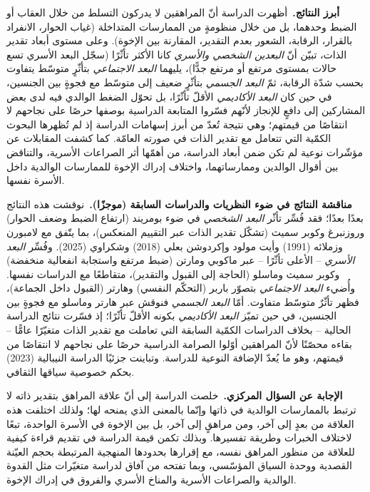 \documentclass[12pt,oneside]{report}
\begin{document}
\medskip
\noindent\textbf{أبرز النتائج.}\ أظهرت الدراسة أنّ المراهقين لا يدركون التسلط من خلال العقاب أو
الضبط وحدهما، بل من خلال منظومةٍ من الممارسات المتداخلة (غياب الحوار، الانفراد بالقرار، الرقابة،
الشعور بعدم التقدير، المقارنة بين الإخوة). وعلى مستوى أبعاد تقدير الذات، تبيّن أنّ \emph{البعدين
الشخصي والأسري} كانا الأكثر تأثّرًا (سجّل البعد الأسري تسع حالات بمستوى مرتفع أو مرتفع جدًّا)،
يليهما \emph{البعد الاجتماعي} بتأثّرٍ متوسّط يتفاوت بحسب شدّة الرقابة، ثمّ \emph{البعد الجسمي}
بتأثّرٍ ضعيف إلى متوسّط مع فجوةٍ بين الجنسين، في حين كان \emph{البعد الأكاديمي} الأقلّ تأثّرًا، بل
تحوّل الضغط الوالدي فيه لدى بعض المشاركين إلى دافعٍ للإنجاز لأنّهم فسّروا المتابعة الدراسية بوصفها
حرصًا على نجاحهم لا انتقاصًا من قيمتهم؛ وهي نتيجة تُعدّ من أبرز إسهامات الدراسة إذ لم تُظهرها
البحوث الكمّية التي تتعامل مع تقدير الذات في صورته العامّة. كما كشفت المقابلات عن مؤشّرات نوعية لم
تكن ضمن أبعاد الدراسة، من أهمّها أثر الصراعات الأسرية، والتناقض بين أقوال الوالدين وممارساتهما،
واختلاف إدراك الإخوة للممارسات الوالدية داخل الأسرة نفسها.

\medskip
\noindent\textbf{مناقشة النتائج في ضوء النظريات والدراسات السابقة (موجزًا).}\ نوقشت هذه النتائج
بعدًا بعدًا؛ فقد فُسِّر تأثّر \emph{البعد الشخصي} في ضوء بومريند (ارتفاع الضبط وضعف الحوار)
وروزنبرغ وكوبر سميث (تشكّل تقدير الذات عبر التقييم المنعكس)، بما يتّفق مع لامبورن وزملائه (1991)
وأيت مولود وإكردوشن بعلي (2018) وشكراوي (2025). وفُسِّر \emph{البعد الأسري} -- الأعلى تأثّرًا --
عبر ماكوبي ومارتن (ضبط مرتفع واستجابة انفعالية منخفضة) وكوبر سميث وماسلو (الحاجة إلى القبول
والتقدير)، متقاطعًا مع الدراسات نفسها. وأُضيء \emph{البعد الاجتماعي} بتصوّر باربر (التحكّم النفسي)
وهارتر (القبول داخل الجماعة)، فظهر تأثّرٌ متوسّط متفاوت. أمّا \emph{البعد الجسمي} فنوقش عبر هارتر
وماسلو مع فجوةٍ بين الجنسين، في حين تميّز \emph{البعد الأكاديمي} بكونه الأقلّ تأثّرًا؛ إذ فسّرت
نتائج الدراسة الحالية -- بخلاف الدراسات الكمّية السابقة التي تعاملت مع تقدير الذات متغيّرًا عامًّا
-- بقاءه محصّنًا لأنّ المراهقين أوّلوا الصرامة الدراسية حرصًا على نجاحهم لا انتقاصًا من قيمتهم،
وهو ما يُعدّ الإضافة النوعية للدراسة. وتباينت جزئيًا الدراسة النيبالية (2023) بحكم خصوصية سياقها
الثقافي.

\medskip
\noindent\textbf{الإجابة عن السؤال المركزي.}\ خلصت الدراسة إلى أنّ علاقة المراهق بتقدير ذاته لا
ترتبط بالممارسات الوالدية في ذاتها وإنّما بالمعنى الذي يمنحه لها؛ ولذلك اختلفت هذه العلاقة من
بعدٍ إلى آخر، ومن مراهقٍ إلى آخر، بل بين الإخوة في الأسرة الواحدة، تبعًا لاختلاف الخبرات وطريقة
تفسيرها. وبذلك تكمن قيمة الدراسة في تقديم قراءة كيفية للعلاقة من منظور المراهق نفسه، مع إقرارها
بحدودها المنهجية المرتبطة بحجم العيّنة القصدية ووحدة السياق المؤسّسي، وبما تفتحه من آفاق لدراسة
متغيّرات مثل القدوة الوالدية والصراعات الأسرية والمناخ الأسري والفروق في إدراك الإخوة.
\end{document}
